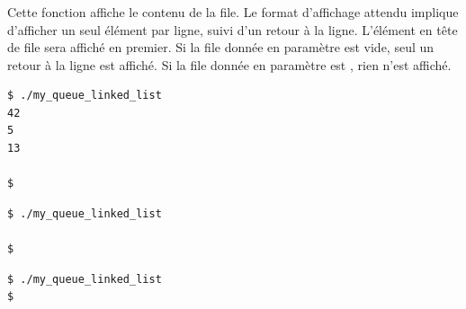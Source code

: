 \subsubsection*{}

\noindent Cette fonction affiche le contenu de la file.
Le format d'affichage attendu implique d'afficher un seul élément par ligne, suivi d'un retour à la ligne.
L'élément en tête de file sera affiché en premier.
Si la file donnée en paramètre est vide, seul un retour à la ligne est affiché.
Si la file donnée en paramètre est , rien n'est affiché.

\bigskip

\lstset{language=sh}
\begin{lstlisting}[frame=single,title={Exemple d'affichage du cas normal : file contenant 42, 5, 13}]
$ ./my_queue_linked_list
42
5
13

$
\end{lstlisting}

\bigskip

\lstset{language=sh}
\begin{lstlisting}[frame=single,title={Exemple d'affichage d'une file vide}]
$ ./my_queue_linked_list

$
\end{lstlisting}

\bigskip

\lstset{language=sh}
\begin{lstlisting}[frame=single,title={Exemple d'affichage d'un pointeur NULL}]
$ ./my_queue_linked_list
$
\end{lstlisting}